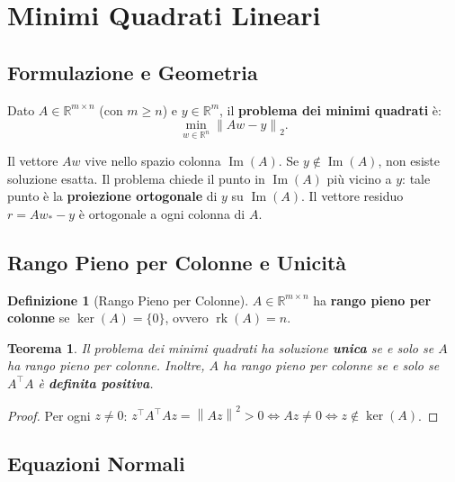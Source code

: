 \documentclass[11pt,a4paper]{article}
\theoremstyle{definition}
\newtheorem{definition}{Definizione}[section]
\theoremstyle{plain}
\newtheorem{theorem}{Teorema}[section]
\theoremstyle{remark}
\newcommand{\R}{\mathbb{R}}
\newcommand{\norm}[1]{\left\| #1 \right\|}
\newcommand{\T}{^{\top}}
\begin{document}
\section{Minimi Quadrati Lineari}
\label{sec:ls}

\subsection{Formulazione e Geometria}

Dato $A \in \R^{m \times n}$ (con $m \geq n$) e $y \in \R^m$, il \textbf{problema dei minimi quadrati} è:
\[
  \min_{w \in \R^n} \norm{Aw - y}_2.
\]

\begin{intubox}
  Il vettore $Aw$ vive nello spazio colonna $\operatorname{Im}(A)$.
  Se $y \notin \operatorname{Im}(A)$, non esiste soluzione esatta.
  Il problema chiede il punto in $\operatorname{Im}(A)$ più vicino a $y$:
  tale punto è la \textbf{proiezione ortogonale} di $y$ su $\operatorname{Im}(A)$.
  Il vettore residuo $r = Aw_* - y$ è ortogonale a ogni colonna di $A$.
\end{intubox}

\subsection{Rango Pieno per Colonne e Unicità}

\begin{definition}[Rango Pieno per Colonne]
  $A \in \R^{m \times n}$ ha \textbf{rango pieno per colonne} se $\ker(A) = \{0\}$,
  ovvero $\operatorname{rk}(A) = n$.
\end{definition}

\begin{theorem}
  Il problema dei minimi quadrati ha soluzione \textbf{unica} se e solo se $A$ ha rango pieno per
  colonne. Inoltre, $A$ ha rango pieno per colonne se e solo se $A\T A$ è \textbf{definita positiva}.
\end{theorem}

\begin{proof}
  Per ogni $z \neq 0$: $z\T A\T A z = \norm{Az}^2 > 0 \iff Az \neq 0 \iff z \notin \ker(A)$.
\end{proof}

\subsection{Equazioni Normali}
\end{document}
